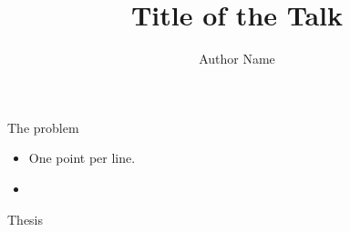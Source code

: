 \documentclass[aspectratio=169,11pt]{beamer}
\title{Title of the Talk}
\author{Author Name}
\institute{Institution}
\date{\TODO{venue \& date}}
\begin{document}
\begin{frame}[plain]\titlepage\end{frame}

\begin{frame}{The problem}
  \begin{itemize}
    \item One point per line.
    \item {}
  \end{itemize}
\end{frame}

\begin{frame}{Thesis}
\end{frame}

\begin{frame}[plain]
  \centering\vfill
  {\brandmark[4cm]}\par\vskip0.5cm
  {\Large\brandwordmark}
  \vfill
\end{frame}
\end{document}
